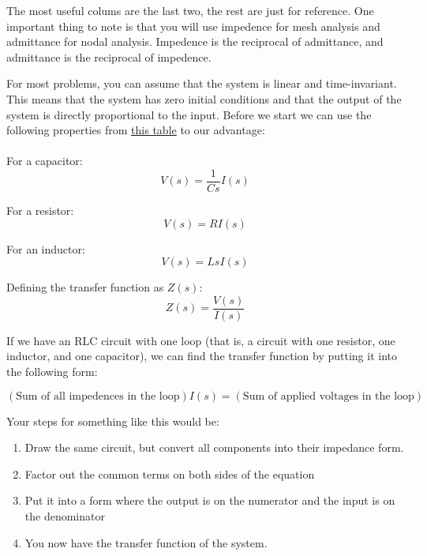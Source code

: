 \documentclass{article}
\theoremstyle{mytheoremstyle}
\theoremstyle{mytheoremstyle}
\theoremstyle{myproblemstyle}
\theoremstyle{break}
\begin{document}
The most useful colums are the last two, the rest are just for reference. One important thing to note is that you will use impedence for mesh analysis and admittance for nodal analysis. Impedence is the reciprocal of admittance, and admittance is the reciprocal of impedence.

For most problems, you can assume that the system is linear and time-invariant. This means that the system has zero initial conditions and that the output of the system is directly proportional to the input. Before we start we can use the following properties from \hyperref[fig:Table For Transfer Functions of Electrical Systems]{this table} to our advantage:\\\\

For a capacitor:
\begin{equation}
    V(s)=\frac1{Cs}I(s)
\end{equation}

For a resistor:
\begin{equation}
	V(s)=RI(s)
\end{equation}

For an inductor:
\begin{equation}
	V(s)=LsI(s)
\end{equation}

Defining the transfer function as $Z(s)$:
\begin{equation}
	Z(s)=\frac{V(s)}{I(s)}
\end{equation}

If we have an RLC circuit with one loop (that is, a circuit with one resistor, one inductor, and one capacitor), we can find the transfer function by putting it into the following form:

\begin{equation}
	(\text{Sum of all impedences in the loop}) I(s) = (\text{Sum of applied voltages in the loop})
\end{equation}

Your steps for something like this would be:
\begin{enumerate}
	\item Draw the same circuit, but convert all components into their impedance form.
	\item Factor out the common terms on both sides of the equation
	\item Put it into a form where the output is on the numerator and the input is on the denominator
	\item You now have the transfer function of the system.
\end{enumerate}
\end{document}
